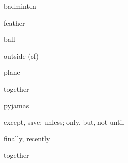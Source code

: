 \documentclass[avery5371,grid,frame]{flashcards}
\begin{document}
\begin{flashcard}{\LARGE badminton}
\LARGE {}
\end{flashcard}
\begin{flashcard}{\LARGE feather}
\LARGE {}
\end{flashcard}
\begin{flashcard}{\LARGE ball}
\LARGE {}
\end{flashcard}
\begin{flashcard}{\LARGE outside (of)}
\LARGE {}
\end{flashcard}
\begin{flashcard}{\LARGE plane}
\LARGE {}
\end{flashcard}
\begin{flashcard}{\LARGE together}
\LARGE {}
\end{flashcard}
\begin{flashcard}{\LARGE pyjamas}
\LARGE {}
\end{flashcard}
\begin{flashcard}{\LARGE except, save; unless; only, but, not until}
\LARGE {}
\end{flashcard}
\begin{flashcard}{\LARGE finally, recently}
\LARGE {}
\end{flashcard}
\begin{flashcard}{\LARGE together}
\LARGE {}
\end{flashcard}
\end{document}
